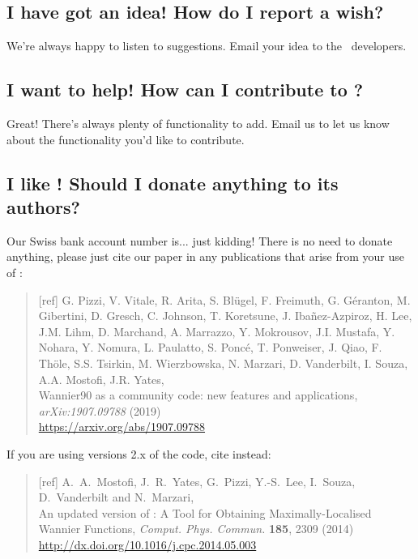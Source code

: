 \subsection{I have got an idea! How do I report a wish?}

We're always happy to listen to suggestions. Email your idea to the
  \wannier\ developers.

\subsection{I want to help! How can I contribute to \wannier?}

Great! There's always plenty of functionality to add. Email us 
to let us know about the functionality you'd like to contribute. 

\subsection{I like \wannier! Should I donate anything to its authors?}

Our Swiss bank account number is... just kidding! There is no need to
donate anything, please just cite our paper in any publications that
arise from your use of \wannier:

\begin{quote}
[ref] G. Pizzi, V. Vitale, R. Arita, S. Bl\"ugel, F. Freimuth, G. G\'eranton, 
   M. Gibertini, D. Gresch, C. Johnson, T. Koretsune, J. Iba\~nez-Azpiroz, 
   H. Lee, J.M. Lihm, D. Marchand, A. Marrazzo, Y. Mokrousov, J.I. Mustafa, 
   Y. Nohara, Y. Nomura, L. Paulatto, S. Ponc\'e, T. Ponweiser, J. Qiao, 
   F. Th\"ole, S.S. Tsirkin, M. Wierzbowska, N. Marzari, D. Vanderbilt, 
   I. Souza, A.A. Mostofi, J.R. Yates,\\
   Wannier90 as a community code: new features and 
  applications, \emph{arXiv:1907.09788} (2019)\\
  \url{https://arxiv.org/abs/1907.09788}
\end{quote}

If you are using versions 2.x of the code, cite instead:

\begin{quote}
[ref] A.~A.~Mostofi, J.~R.~Yates, G.~Pizzi, Y.-S.~Lee, I.~Souza, D.~Vanderbilt
and N.~Marzari,\\
An updated version of \wannier: 
A Tool for Obtaining Maximally-Localised Wannier
  Functions, {\it Comput. Phys. Commun.} {\bf 185}, 2309 (2014)\\
\url{http://dx.doi.org/10.1016/j.cpc.2014.05.003}
\end{quote} 

